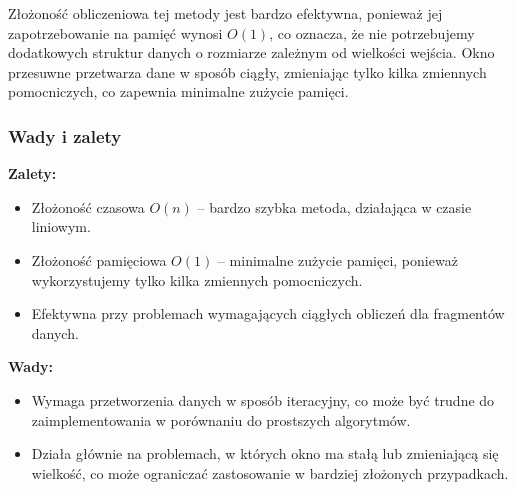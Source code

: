\documentclass[12pt,twoside]{article}
\begin{document}
Złożoność obliczeniowa tej metody jest bardzo efektywna, ponieważ jej zapotrzebowanie na pamięć wynosi $O(1)$, co oznacza, że nie potrzebujemy dodatkowych struktur danych o rozmiarze zależnym od wielkości wejścia. Okno przesuwne przetwarza dane w sposób ciągły, zmieniając tylko kilka zmiennych pomocniczych, co zapewnia minimalne zużycie pamięci.

\subsubsection{Wady i zalety}

\textbf{Zalety:}
\begin{itemize}
    \item Złożoność czasowa $O(n)$ – bardzo szybka metoda, działająca w czasie liniowym.
    \item Złożoność pamięciowa $O(1)$ – minimalne zużycie pamięci, ponieważ wykorzystujemy tylko kilka zmiennych pomocniczych.
    \item Efektywna przy problemach wymagających ciągłych obliczeń dla fragmentów danych.
\end{itemize}
\textbf{Wady:}
\begin{itemize}
    \item Wymaga przetworzenia danych w sposób iteracyjny, co może być trudne do zaimplementowania w porównaniu do prostszych algorytmów.
    \item Działa głównie na problemach, w których okno ma stałą lub zmieniającą się wielkość, co może ograniczać zastosowanie w bardziej złożonych przypadkach.
\end{itemize}
\end{document}
